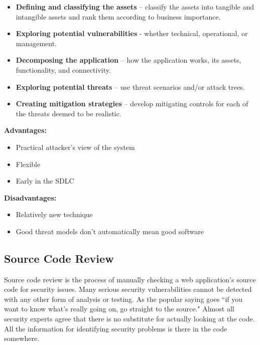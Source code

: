 			\begin{itemize}
				\item {\bf Defining and classifying the assets} – classify the assets into tangible and intangible assets and rank them according to business importance.
				\item {\bf Exploring potential vulnerabilities} - whether technical, operational, 
				or management.
				\item {\bf Decomposing the application} – how the application works, its assets,
				functionality, and connectivity.
				\item {\bf Exploring potential threats} – use threat scenarios and/or attack trees.
				\item {\bf Creating mitigation strategies} – develop mitigating controls for each of the threats deemed to be realistic.
			\end{itemize}

			{\bf Advantages:}
				\begin{itemize}
					\item Practical attacker's view of the system
					\item Flexible
					\item Early in the SDLC
				\end{itemize}

			{\bf Disadvantages:}
				\begin{itemize}
					\item Relatively new technique
					\item Good threat models don’t automatically mean good software
				\end{itemize}

		\clearpage
		\subsection{Source Code Review}
			Source code review is the process of manually checking a web application's source 
			code for security issues. Many serious security vulnerabilities cannot be detected 
			with any other form of analysis or testing. As the popular saying goes “if you
			want to know what’s really going on, go straight to the source." Almost all 
			security experts agree that there is no substitute for actually looking at the 
			code. All the information for identifying security problems is there in the code
			somewhere.

